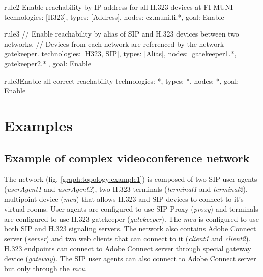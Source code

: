 \begin{TopologyExample}{rule2}%
      {Enable reachability by IP address for all H.323 devices at FI MUNI}
technologies: [H323],
types: [Address],
nodes: cz.muni.fi.*,
goal: Enable
\end{TopologyExample}

\begin{TopologyExample}{rule3}{}
// Enable reachability by alias of SIP and H.323 devices between two networks.
// Devices from each network are referenced by the network gatekeeper.
technologies: [H323, SIP],
types: [Alias],
nodes: [gatekeeper1.*, gatekeeper2.*],
goal: Enable
\end{TopologyExample}

\begin{TopologyExample}{rule3}{Enable all correct reachability}
technologies: *,
types: *,
nodes: *,
goal: Enable
\end{TopologyExample}


\section{Examples}

\subsection{Example of complex videoconference network}

The network (fig. \ref{graph:topology:example1}) is composed of two SIP user 
agents (\emph{userAgent1} and \emph{userAgent2}), two H.323 terminals 
(\emph{terminal1} and \emph{terminal2}), multipoint device (\emph{mcu}) that 
allows H.323 and SIP devices to connect to it's virtual rooms. User agents 
are configured to use SIP Proxy (\emph{proxy}) and terminals are configured 
to use H.323 gatekeeper (\emph{gatekeeper}). The \emph{mcu} is configured to 
use both SIP and H.323 signaling servers. The network also contains Adobe 
Connect server (\emph{server}) and two web clients that can connect to it 
(\emph{client1} and \emph{client2}). H.323 endpoints can connect to Adobe 
Connect server through special gateway device (\emph{gateway}). The SIP user 
agents can also connect to Adobe Connect server but only through the 
\emph{mcu}.


